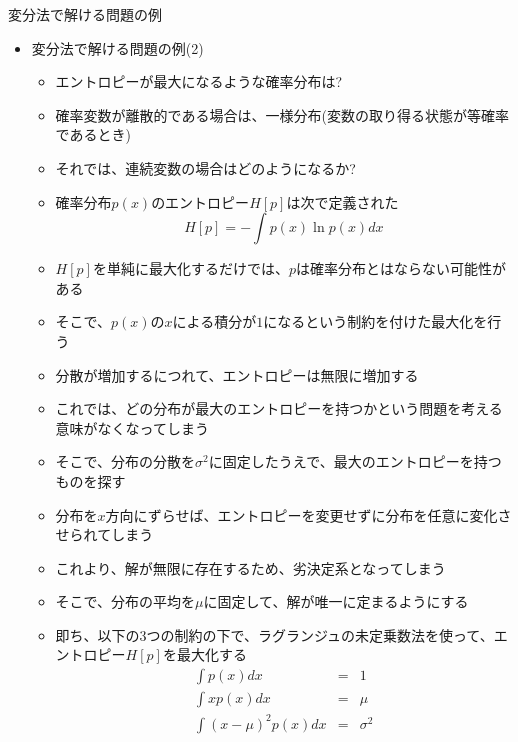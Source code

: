\documentclass[dvipdfmx,notheorems,t]{beamer}
\begin{document}
\begin{frame}{変分法で解ける問題の例}

\begin{itemize}
	\item 変分法で解ける問題の例(2)
	\begin{itemize}
		\item エントロピーが最大になるような確率分布は?
		\newline
		
		\item 確率変数が離散的である場合は、一様分布(変数の取り得る状態が等確率であるとき)
		\item それでは、\alert{連続変数の場合}はどのようになるか?
		\newline
		\item 確率分布$p(x)$のエントロピー$H[p]$は次で定義された
		\begin{equation}
			H[p] = -\int p(x) \ln p(x) dx
		\end{equation}
		
		\item $H[p]$を単純に最大化するだけでは、$p$は確率分布とはならない可能性がある
		\item そこで、\color{red}$p(x)$の$x$による積分が$1$になる\normalcolor という制約を付けた最大化を行う
		\newline
		\item 分散が増加するにつれて、エントロピーは無限に増加する
		\item これでは、どの分布が最大のエントロピーを持つかという問題を考える意味がなくなってしまう
		\item そこで、\color{red}分布の分散を$\sigma^2$に固定\normalcolor したうえで、最大のエントロピーを持つものを探す
		\newline
		\item 分布を$x$方向にずらせば、エントロピーを変更せずに分布を任意に変化させられてしまう
		\item これより、解が無限に存在するため、劣決定系となってしまう
		\item そこで、\color{red}分布の平均を$\mu$に固定\normalcolor して、解が唯一に定まるようにする
		\newline
		\item 即ち、以下の3つの制約の下で、ラグランジュの未定乗数法を使って、エントロピー$H[p]$を最大化する
		\begin{eqnarray}
			\int p(x) dx &=& 1 \\
			\int x p(x) dx &=& \mu \\
			\int (x - \mu)^2 p(x) dx &=& \sigma^2
		\end{eqnarray}
		

\end{itemize}
\end{itemize}
\end{frame}
\end{document}

